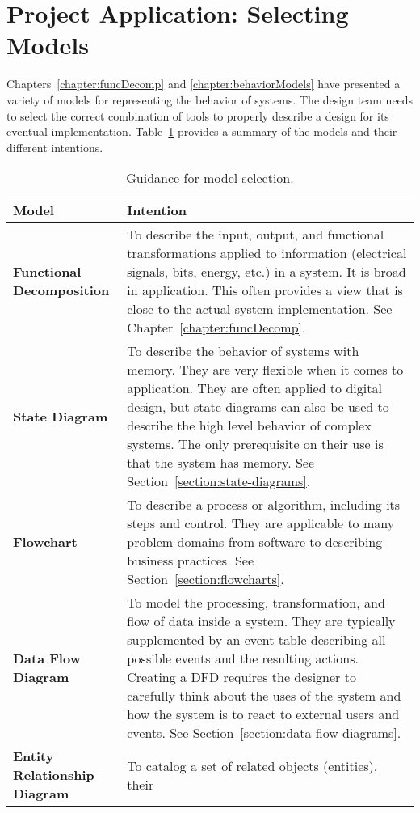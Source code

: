 \section{Project Application: Selecting Models}
\label{section:project-application-selecting-models}

Chapters~\ref{chapter:funcDecomp} and \ref{chapter:behaviorModels} 
have presented a variety of models for representing the
behavior of systems. The design team needs to select the correct
combination of tools to properly describe a design for its eventual
implementation. Table~\ref{table:guidanceModelSelection} 
provides a summary of the models and their different intentions.

\begin{table}[h]
\caption{Guidance for model selection.}
\label{table:guidanceModelSelection}
\begin{tabular}{|l|m{10cm}|}
\hline
\textbf{Model} & \textbf{Intention} \\ \hline
\textbf{Functional Decomposition} & To describe the input, output, and
functional transformations applied to information (electrical signals,
bits, energy, etc.) in a system. It is broad in application. This often
provides a view that is close to the actual system implementation. See
Chapter~\ref{chapter:funcDecomp}. \\ \hline
\textbf{State Diagram} & To describe the behavior of systems with
memory. They are very flexible when it comes to application. They are
often applied to digital design, but state diagrams can also be used to
describe the high level behavior of complex systems. The only
prerequisite on their use is that the system has memory. See 
Section~\ref{section:state-diagrams}. \\ \hline
\textbf{Flowchart} & To describe a process or algorithm, including its
steps and control. They are applicable to many problem domains from
software to describing business practices. See 
Section~\ref{section:flowcharts}. \\ \hline
\textbf{Data Flow Diagram} & To model the processing, transformation, and flow of
data inside a system. They are typically supplemented by an event table
describing all possible events and the resulting actions. Creating a DFD
requires the designer to carefully think about the uses of the system
and how the system is to react to external users and events. See 
Section~\ref{section:data-flow-diagrams}. \\  \hline
\textbf{Entity Relationship Diagram} & To catalog a set of related objects (entities), their

\end{tabular}
\end{table}
